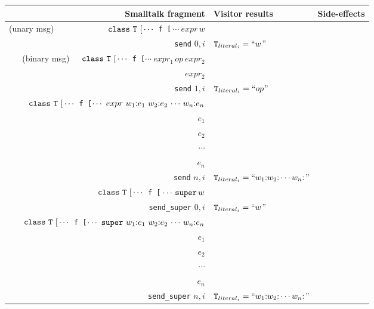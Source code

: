 \documentclass[11pt]{article}
\begin{document}

\def\arraystretch{1.0}

\begin{figure}
\begin{center}
\begin{tabular}[t]{r | l | l }
{\bf Smalltalk fragment} & {\bf Visitor results} & {\bf Side-effects}\\
\hline
(unary msg)~~~~~~~~~~~~\, ${\tt class~ T~[} \cdots\,$ {\tt f\,[}\,$\cdots ~expr \,w$ &
\begin{minipage}[t]{0.2\linewidth}
$expr$\\
{\tt send} $0,i$\vspace{5pt}
\end{minipage}  & $\text{\tt T}_{literal_i} = ``w$'' \\

(binary msg)~~~${\tt class~ T~[} \cdots\,$ {\tt f\,[}$\cdots ~expr_1\, op~ expr_2$ &
\begin{minipage}[t]{0.2\linewidth}
$expr_1$\\
$expr_2$\\
{\tt send} $1,i$\vspace{5pt}
\end{minipage}  & $\text{\tt T}_{literal_i} = ``op$'' \\

${\tt class~ T~[} \cdots\,$ {\tt f\,[}$\cdots ~expr ~w_1{\tt :} e_1 ~ w_2{\tt :} e_2 \, \cdots \, w_n{\tt :} e_n$ &
\begin{minipage}[t]{0.2\linewidth}
$expr$\\
$e_1$\\
$e_2$\\
$\cdots$\\
$e_n$\\
{\tt send} $n,i$\vspace{5pt}
\end{minipage}  & $\text{\tt T}_{literal_i} = ``w_1{\tt :}w_2{\tt :}\cdots w_n{\tt :}$'' \\

${\tt class~ T~[} \cdots\,$ {\tt f\,[}$\,\cdots \,{\tt super} \,w$ &
\begin{minipage}[t]{0.2\linewidth}
{\tt self}\\
{\tt send\_super} $0,i$\vspace{5pt}
\end{minipage}  & $\text{\tt T}_{literal_i} = ``w$'' \\

${\tt class~ T~[} \cdots\,$ {\tt f\,[}$\cdots ~{\tt super} ~w_1{\tt :} e_1 ~ w_2{\tt :} e_2 \, \cdots \, w_n{\tt :} e_n$ &
\begin{minipage}[t]{0.2\linewidth}
{\tt self}\\
$e_1$\\
$e_2$\\
$\cdots$\\
$e_n$\\
{\tt send\_super} $n,i$\vspace{3pt}
\end{minipage}  & $\text{\tt T}_{literal_i} = ``w_1{\tt :}w_2{\tt :}\cdots w_n{\tt :}$''\\


\end{tabular}
\end{center}
\end{figure}
\end{document}
